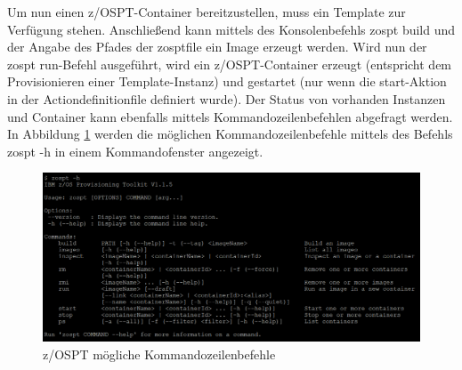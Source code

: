 Um nun einen z/OSPT-Container bereitzustellen, muss ein Template zur Verfügung stehen.
Anschließend kann mittels des Konsolenbefehls \glqq zospt build\grqq{} und der Angabe des Pfades der zosptfile ein Image erzeugt werden.
Wird nun der \glqq zospt run\grqq-Befehl ausgeführt, wird ein z/OSPT-Container erzeugt (entspricht dem Provisionieren einer Template-Instanz) und gestartet (nur wenn die start-Aktion in der Actiondefinitionfile definiert wurde).
Der Status von vorhanden Instanzen und Container kann ebenfalls mittels Kommandozeilenbefehlen abgefragt werden.
In Abbildung \ref{fig:zospt_help} werden die möglichen Kommandozeilenbefehle mittels des Befehls \glqq zospt -h\grqq{} in einem Kommandofenster angezeigt. 
\begin{figure}[h]
	\centering
	\includegraphics[width=\textwidth]{figures/zospt_help_putty.png}
	\caption{z/OSPT mögliche Kommandozeilenbefehle}
	\label{fig:zospt_help}
\end{figure}
